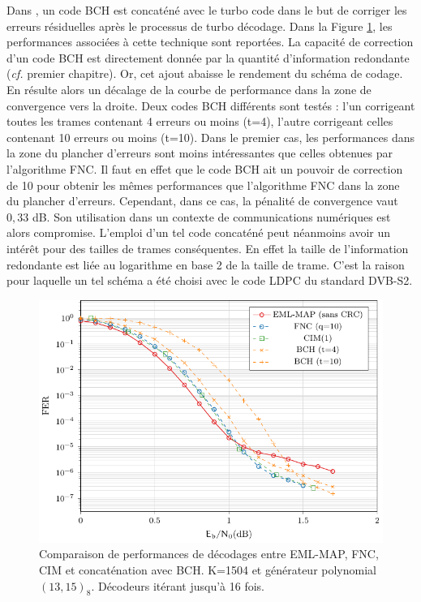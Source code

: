 Dans \cite{andersenBCH}, un code BCH est concaténé avec le turbo code dans le but de corriger les erreurs résiduelles 
après le processus de turbo décodage. Dans la Figure \ref{fig:fnc_soa}, les performances associées à cette technique sont
reportées. La capacité de 
correction d'un code BCH est directement donnée par la quantité d'information redondante (\textit{cf.} premier chapitre). Or, cet 
ajout abaisse le rendement du schéma de codage. En résulte alors un décalage de la courbe de performance dans la zone de convergence 
vers la droite. Deux codes BCH différents sont testés : l'un corrigeant toutes les trames contenant 4 erreurs ou moins (t=4), l'autre 
corrigeant celles contenant 10 erreurs ou moins (t=10). Dans le premier cas, les performances dans la zone du plancher 
d'erreurs sont moins intéressantes que celles obtenues par l'algorithme FNC. Il faut en effet que le code BCH ait un pouvoir
de correction de 10 pour obtenir les mêmes performances que l'algorithme FNC dans la zone du plancher d'erreurs. Cependant, 
dans ce cas, la pénalité de convergence vaut $0,33$ dB. Son utilisation dans un contexte de communications numériques 
est alors compromise. L'emploi d'un tel code concaténé peut néanmoins avoir un intérêt pour des tailles de trames
conséquentes. En effet la taille de l'information redondante est liée au logarithme en base 2 de la taille de trame.
C'est la raison pour laquelle un tel schéma a été choisi avec le code LDPC du standard DVB-S2.

\begin{figure}[!htb]
	\centering
	\includegraphics[width=\textwidth]{main/ch3_fig/fnc/soa/tikz/soa.pdf}
	\caption{Comparaison de performances de décodages entre EML-MAP, FNC, CIM et concaténation avec BCH. K=1504 et générateur
	polynomial $(13,15)_8$.	Décodeurs itérant jusqu'à 16 fois. \label{fig:fnc_soa}}
\end{figure}

